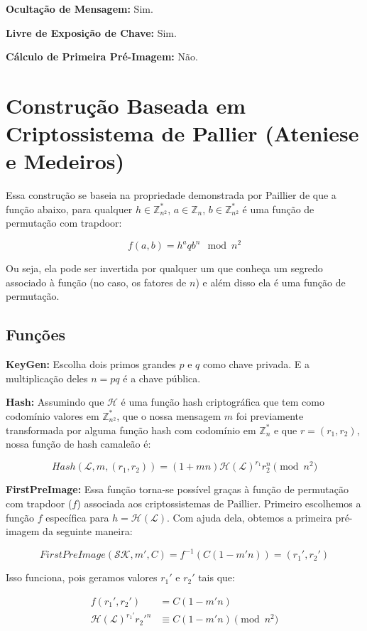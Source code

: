\documentclass[a4paper]{article}
\begin{document}
\textbf{Ocultação de Mensagem: }Sim.

\textbf{Livre de Exposição de Chave: }Sim.

\textbf{Cálculo de Primeira Pré-Imagem: }Não.

\section{Construção Baseada em Criptossistema de Pallier (Ateniese e Medeiros) \cite{ateniese}}

Essa construção se baseia na propriedade demonstrada por
Paillier\cite{paillier} de que a função abaixo, para qualquer $h \in
\mathbb{Z}^*_{n^2}$, $a\in\mathbb{Z}_n$, $b\in\mathbb{Z}^*_{n^2}$ é
uma função de permutação com trapdoor:

$$
f(a, b) = h^aqb^n \mod n^2
$$

Ou seja, ela pode ser invertida por qualquer um que conheça um segredo
associado à função (no caso, os fatores de $n$) e além disso ela é uma
função de permutação.

\subsection{Funções}

\textbf{KeyGen: } Escolha dois primos grandes $p$ e $q$ como chave
privada. E a multiplicação deles $n=pq$ é a chave pública.

\textbf{Hash: } Assumindo que $\mathcal{H}$ é uma função hash
criptográfica que tem como codomínio valores em $\mathbb{Z}^*_{n^2}$,
que o nossa mensagem $m$ foi previamente transformada por alguma
função hash com codomínio em $\mathbb{Z}^*_{n}$ e que $r = (r_1,
r_2)$, nossa função de hash camaleão é:

$$
Hash(\mathcal{L}, m, (r_1, r_2)) = (1 +mn)\mathcal{H}(\mathcal{L})^{r_1}r_2^n \pmod{n^2}
$$

\textbf{FirstPreImage:} Essa função torna-se possível graças à função
de permutação com trapdoor ($f$) associada aos criptossistemas de
Paillier. Primeiro escolhemos a função $f$ específica para
$h=\mathcal{H}(\mathcal{L})$. Com ajuda dela, obtemos a primeira
pré-imagem da seguinte maneira:

$$
FirstPreImage(\mathcal{SK}, m', C) = f^{-1}(C(1-m'n)) = (r_1', r_2')
$$

Isso funciona, pois geramos valores $r_1'$ e $r_2'$ tais que:

\begin{equation}
\begin{split}
  f(r_1', r_2') &= C(1-m'n)\\
  \mathcal{H}(\mathcal{L})^{r_1'}r_2'^n &\equiv C(1-m'n) \pmod{n^2}\\
\end{split}
\end{equation}
\end{document}
